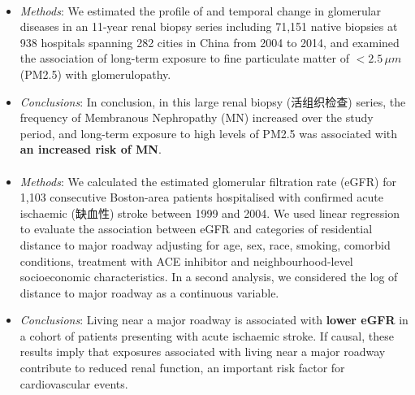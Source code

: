 \documentclass[11pt]{article}
\begin{document}
\paragraph{\citet{xu2016long}}
\begin{itemize}
    \item \textit{Methods}: We estimated the profile of and temporal change in glomerular diseases in an 11-year renal biopsy series including 71,151 native biopsies at 938 hospitals spanning 282 cities in China from 2004 to 2014, and examined the association of long-term exposure to fine particulate matter of $<2.5\,\mu m$ (PM2.5) with glomerulopathy. 
    \item \textit{Conclusions}: In conclusion, in this large renal biopsy (活组织检查) series, the frequency of Membranous Nephropathy (MN) increased over the study period, and long-term exposure to high levels of PM2.5 was associated with \textbf{an increased risk of MN}.
\end{itemize}

\paragraph{\citet{lue2013residential}}
\begin{itemize}
    \item \textit{Methods}: We calculated the estimated glomerular filtration rate (eGFR) for 1,103 consecutive Boston-area patients hospitalised with confirmed acute ischaemic (缺血性) stroke between 1999 and 2004. We used linear regression to evaluate the association between eGFR and categories of residential distance to major roadway adjusting for age, sex, race, smoking, comorbid conditions, treatment with ACE inhibitor and neighbourhood-level socioeconomic characteristics. In a second analysis, we considered the log of distance to major roadway as a continuous variable.
    \item \textit{Conclusions}: Living near a major roadway is associated with \textbf{lower eGFR} in a cohort of patients presenting with acute ischaemic stroke. If causal, these results imply that exposures associated with living near a major roadway contribute to reduced renal function, an important risk factor for cardiovascular events.
\end{itemize}
\end{document}
